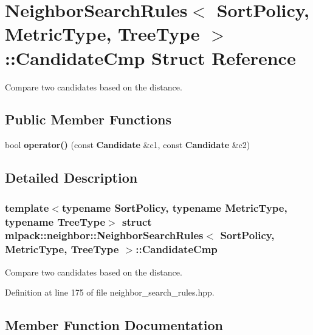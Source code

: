 \section{Neighbor\+Search\+Rules$<$ Sort\+Policy, Metric\+Type, Tree\+Type $>$\+:\+:Candidate\+Cmp Struct Reference}
\label{structmlpack_1_1neighbor_1_1NeighborSearchRules_1_1CandidateCmp}


Compare two candidates based on the distance.  


\subsection*{Public Member Functions}
\begin{DoxyCompactItemize}
\item 
bool \textbf{ operator()} (const \textbf{ Candidate} \&c1, const \textbf{ Candidate} \&c2)
\end{DoxyCompactItemize}


\subsection{Detailed Description}
\subsubsection*{template$<$typename Sort\+Policy, typename Metric\+Type, typename Tree\+Type$>$\newline
struct mlpack\+::neighbor\+::\+Neighbor\+Search\+Rules$<$ Sort\+Policy, Metric\+Type, Tree\+Type $>$\+::\+Candidate\+Cmp}

Compare two candidates based on the distance. 

Definition at line 175 of file neighbor\+\_\+search\+\_\+rules.\+hpp.



\subsection{Member Function Documentation}
\mbox{\label{structmlpack_1_1neighbor_1_1NeighborSearchRules_1_1CandidateCmp_a1774b25e773200aae4c9892fe8717e38}} 
